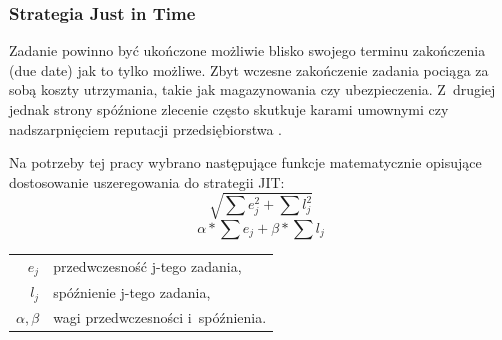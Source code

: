 \documentclass{prezentacja}
\begin{document}
\begin{frame}
    \frametitle{Strategia Just in Time}
    Zadanie powinno być ukończone możliwie blisko swojego terminu zakończenia (due date) jak to tylko możliwe. Zbyt wczesne zakończenie zadania pociąga za sobą koszty utrzymania, takie jak magazynowania czy ubezpieczenia. Z~drugiej jednak strony spóźnione zlecenie często skutkuje karami umownymi czy nadszarpnięciem reputacji przedsiębiorstwa \cite{genetyczne}.

    Na potrzeby tej pracy wybrano następujące funkcje matematycznie opisujące dostosowanie uszeregowania do strategii JIT:
\small{
    \begin{equation}
        \sqrt{\sum e_j^2 + \sum l_j^2}
        \label{eq:w1}
    \end{equation}
    \begin{equation}
        \alpha*\sum e_j + \beta*\sum l_j
        \label{eq:w2}
    \end{equation}
}
\footnotesize{
    \begin{tabular}{r l}    
    \(e_j\) & przedwczesność j-tego zadania, \\
    \(l_j\) & spóźnienie j-tego zadania, \\
    \(\alpha, \beta\) & wagi przedwczesności i~spóźnienia.
    \end{tabular}
}
\end{frame}
\end{document}
